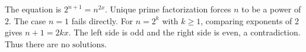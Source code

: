The equation is $2^{n+1}=n^{2x}$. Unique prime factorization forces $n$ to be a power of $2$. The case $n=1$ fails directly. For $n=2^k$ with $k\ge1$, comparing exponents of $2$ gives $n+1=2kx$. The left side is odd and the right side is even, a contradiction. Thus there are $\boxed{\text{no solutions}}$.
